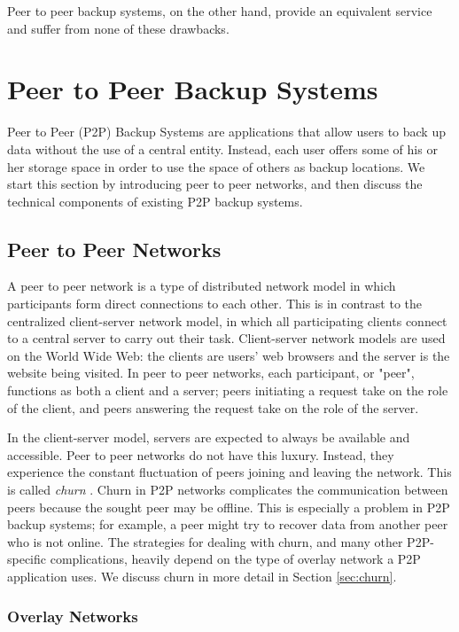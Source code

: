 \documentclass[12pt]{report}
\begin{document}
Peer to peer backup systems, on the other hand, provide an equivalent service and suffer from none of these drawbacks.

\section{Peer to Peer Backup Systems}

Peer to Peer (P2P) Backup Systems are applications that allow users to back up data without the use of a central entity. Instead, each user offers some of his or her storage space in order to use the space of others as backup locations. We start this section by introducing peer to peer networks, and then discuss the technical components of existing P2P backup systems.

\subsection{Peer to Peer Networks} \label{subsec:PeertoPeerNetworks}

A peer to peer network is a type of distributed network model in which participants form direct connections to each other. This is in contrast to the centralized client-server network model, in which all participating clients connect to a central server to carry out their task. Client-server network models are used on the World Wide Web: the clients are users' web browsers and the server is the website being visited. In peer to peer networks, each participant, or "peer", functions as both a client and a server; peers initiating a request take on the role of the client, and peers answering the request take on the role of the server.

In the client-server model, servers are expected to always be available and accessible. Peer to peer networks do not have this luxury. Instead, they experience the constant fluctuation of peers joining and leaving the network. This is called \textit{churn} \cite{StorageSearchP2PNetworks}. Churn in P2P networks complicates the communication between peers because the sought peer may be offline. This is especially a problem in P2P backup systems; for example, a peer might try to recover data from another peer who is not online. The strategies for dealing with churn, and many other P2P-specific complications, heavily depend on the type of overlay network a P2P application uses. We discuss churn in more detail in Section \ref{sec:churn}.

\subsubsection{Overlay Networks}
\end{document}
